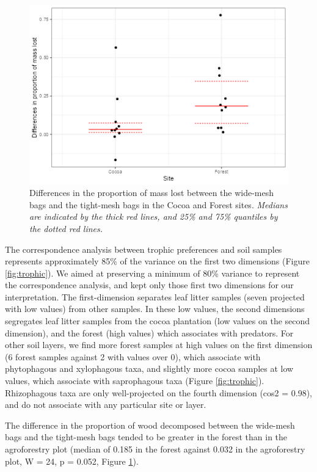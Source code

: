 \documentclass[fleqn,10pt]{ArtEcoFoG} %
\begin{document}
\begin{figure}

{\centering \includegraphics[width=0.8\linewidth]{rapport_files/figure-latex/wood-1} 

}

\caption{Differences in the proportion of mass lost between the wide-mesh bags and the tight-mesh bags in the Cocoa and Forest sites. \textit{Medians are indicated by the thick red lines, and 25\% and 75\% quantiles by the dotted red lines.}}\label{fig:wood}
\end{figure}

\normalsize

The correspondence analysis between trophic preferences and soil samples represents approximately 85\% of the variance on the first two dimensions (Figure \ref{fig:trophic}). We aimed at preserving a minimum of 80\% variance to represent the correspondence analysis, and kept only those first two dimensions for our interpretation. The first-dimension separates leaf litter samples (seven projected with low values) from other samples. In these low values, the second dimensions segregates leaf litter samples from the cocoa plantation (low values on the second dimension), and the forest (high values) which associates with predators. For other soil layers, we find more forest samples at high values on the first dimension (6 forest samples against 2 with values over 0), which associate with phytophagous and xylophagous taxa, and slightly more cocoa samples at low values, which associate with saprophagous taxa (Figure \ref{fig:trophic}). Rhizophagous taxa are only well-projected on the fourth dimension (cos2 = 0.98), and do not associate with any particular site or layer.

The difference in the proportion of wood decomposed between the wide-mesh bags and the tight-mesh bags tended to be greater in the forest than in the agroforestry plot (median of 0.185 in the forest against 0.032 in the agroforestry plot, W = 24, p = 0.052, Figure \ref{fig:wood}).
\end{document}
